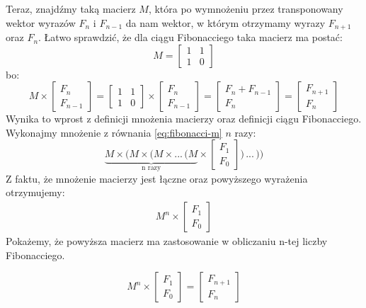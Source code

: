 Teraz, znajdźmy taką macierz $M$, która po wymnożeniu przez transponowany wektor wyrazów $F_{n}$ i $F_{n - 1}$ da nam wektor, w którym otrzymamy wyrazy $F_{n + 1}$ oraz $F_{n}$. 
Łatwo sprawdzić, że dla ciągu Fibonacciego taka macierz ma postać:
\begin{equation*}
  M = \begin{bmatrix}1 & 1 \\ 1 & 0\end{bmatrix}
\end{equation*}
bo:
\begin{equation}
  \label{eq:fibonacci-m}
  M
  \times
  \begin{bmatrix}F_n \\ F_{n - 1}\end{bmatrix}
  =
  \begin{bmatrix}1 & 1 \\ 1 & 0\end{bmatrix}
  \times
  \begin{bmatrix}F_n \\ F_{n - 1}\end{bmatrix}
  =
  \begin{bmatrix}F_n + F_{n - 1} \\ F_{n}\end{bmatrix}
  =
  \begin{bmatrix}F_{n + 1} \\ F_{n}\end{bmatrix}
\end{equation}
Wynika to wprost z definicji mnożenia macierzy oraz definicji ciągu Fibonacciego.
Wykonajmy mnożenie z równania \ref{eq:fibonacci-m} $n$ razy:
\begin{equation*}
  \underbrace{M \times \bigg(M \times \bigg(M \times ...\,\bigg(M}_\text{n razy}
  \times
  \begin{bmatrix}F_1 \\ F_0\end{bmatrix}\bigg)\,...\,\bigg)\bigg)
\end{equation*}
Z faktu, że mnożenie macierzy jest łączne oraz powyższego wyrażenia otrzymujemy:
\begin{align*}
  M^n \times \begin{bmatrix}F_1 \\ F_0\end{bmatrix}
\end{align*}
Pokażemy, że powyższa macierz ma zastosowanie w obliczaniu n-tej liczby Fibonacciego.
\begin{lemma}
  \begin{equation*}
    M^{n} \times \begin{bmatrix}F_1 \\ F_0\end{bmatrix} = \begin{bmatrix}F_{n + 1} \\ F_{n}\end{bmatrix}
  \end{equation*}
\end{lemma}

